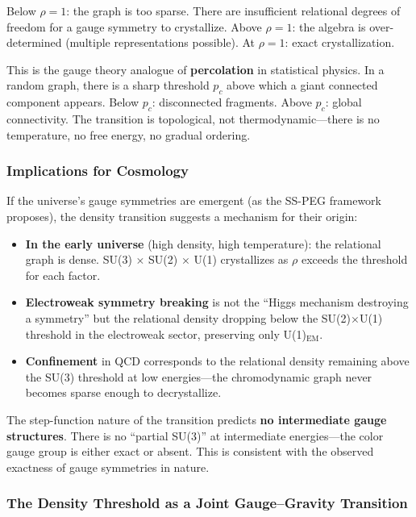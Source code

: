 Below $\rho = 1$: the graph is too sparse. There are insufficient relational degrees of freedom for a gauge symmetry to crystallize. Above $\rho = 1$: the algebra is over-determined (multiple representations possible). At $\rho = 1$: exact crystallization.

This is the gauge theory analogue of \textbf{percolation} in statistical physics. In a random graph, there is a sharp threshold $p_c$ above which a giant connected component appears. Below $p_c$: disconnected fragments. Above $p_c$: global connectivity. The transition is topological, not thermodynamic---there is no temperature, no free energy, no gradual ordering.

\subsubsection{Implications for Cosmology}

If the universe's gauge symmetries are emergent (as the SS-PEG framework proposes), the density transition suggests a mechanism for their origin:

\begin{itemize}
\item \textbf{In the early universe} (high density, high temperature): the relational graph is dense. SU(3) $\times$ SU(2) $\times$ U(1) crystallizes as $\rho$ exceeds the threshold for each factor.
\item \textbf{Electroweak symmetry breaking} is not the ``Higgs mechanism destroying a symmetry'' but the relational density dropping below the SU(2)$\times$U(1) threshold in the electroweak sector, preserving only U(1)$_{\mathrm{EM}}$.
\item \textbf{Confinement} in QCD corresponds to the relational density remaining above the SU(3) threshold at low energies---the chromodynamic graph never becomes sparse enough to decrystallize.
\end{itemize}

The step-function nature of the transition predicts \textbf{no intermediate gauge structures}. There is no ``partial SU(3)'' at intermediate energies---the color gauge group is either exact or absent. This is consistent with the observed exactness of gauge symmetries in nature.

\subsubsection{The Density Threshold as a Joint Gauge--Gravity Transition}

